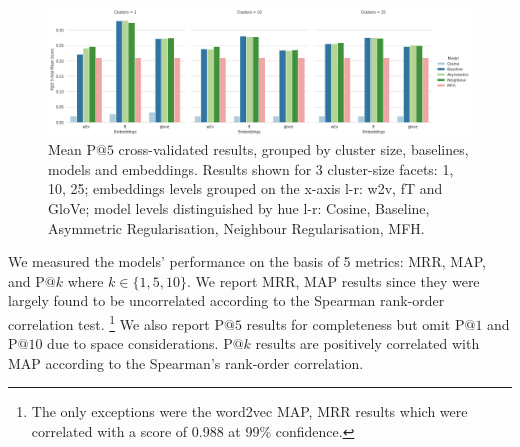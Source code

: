\begin{figure}[ht!] 
  \centering
  \includegraphics[width=1.\linewidth]{images/PAt5_5-fold_results_models_baselines_embeddings.png}
  \caption[Mean P$@5$ cross-validated results, grouped by cluster size, baselines, models and embeddings]{Mean P$@5$ cross-validated results, grouped by cluster size, baselines, models and embeddings.  Results shown for 3 cluster-size facets: 1, 10, 25; embeddings levels grouped on the x-axis l-r: w2v, fT and GloVe; model levels distinguished by hue l-r: Cosine, Baseline, Asymmetric Regularisation, Neighbour Regularisation, MFH.}
  \label{fig:pat5_models_baselines}
\end{figure}

We measured the models' performance on the basis of 5 metrics: \ac{MRR}, \ac{MAP}, and P$@k$ where $k \in \{1, 5, 10\}$.  We report MRR, MAP results since they were largely found to be uncorrelated according to the Spearman rank-order correlation test. \footnote{The only exceptions were the word2vec MAP, MRR results which were correlated with a score of 0.988 at 99\% confidence.}   We also report P$@5$ results for completeness but omit P$@1$ and P$@10$ due to space considerations.  P$@k$ results are positively correlated with \ac{MAP} according to the Spearman's rank-order correlation.

